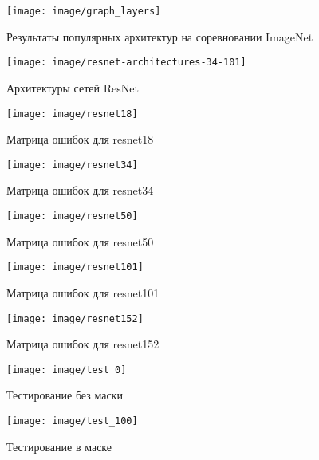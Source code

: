 \documentclass[a4paper,14pt]{article}
\begin{document}
	
	\begin{figure}[H]
		\centering
		\texttt{[image: image/graph\_layers]}
		\caption{Результаты популярных архитектур на соревновании ImageNet}
		\label{fig:graphlayers}
	\end{figure}
	
	\begin{figure}[H]
		\centering
		\texttt{[image: image/resnet-architectures-34-101]}
		\caption{Архитектуры сетей ResNet}
		\label{fig:resnet-architectures-34-101}
	\end{figure}
	
	
	\begin{figure}[H]
		\centering
		\texttt{[image: image/resnet18]}
		\caption{Матрица ошибок для resnet18}
		\label{fig:resnet18}
	\end{figure}
	
	\begin{figure}[H]
		\centering
		\texttt{[image: image/resnet34]}
		\caption{Матрица ошибок для resnet34}
		\label{fig:resnet34}
	\end{figure}
	
	\begin{figure}[H]
		\centering
		\texttt{[image: image/resnet50]}
		\caption{Матрица ошибок для resnet50}
		\label{fig:resnet50}
	\end{figure}
	
	\begin{figure}[H]
		\centering
		\texttt{[image: image/resnet101]}
		\caption{Матрица ошибок для resnet101}
		\label{fig:resnet101}
	\end{figure}
	
	\begin{figure}[H]
		\centering
		\texttt{[image: image/resnet152]}
		\caption{Матрица ошибок для resnet152}
		\label{fig:resnet152}
	\end{figure}
	
	\begin{figure}[H]
		\centering
		\texttt{[image: image/test\_0]}
		\caption{Тестирование без маски}
		\label{fig:test0}
	\end{figure}
	
	\begin{figure}[H]
		\centering
		\texttt{[image: image/test\_100]}
		\caption{Тестирование в маске}
		\label{fig:test100}
	\end{figure}
	
\end{document}
